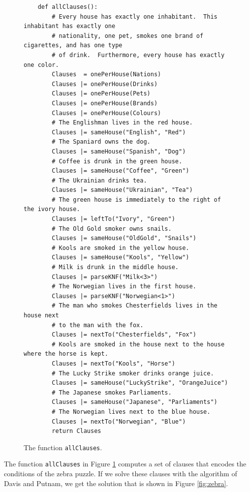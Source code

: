 \begin{figure}[!ht]
\centering
\begin{verbatim}
    def allClauses():
        # Every house has exactly one inhabitant.  This inhabitant has exactly one
        # nationality, one pet, smokes one brand of cigarettes, and has one type
        # of drink.  Furthermore, every house has exactly one color.
        Clauses  = onePerHouse(Nations)
        Clauses |= onePerHouse(Drinks)
        Clauses |= onePerHouse(Pets)
        Clauses |= onePerHouse(Brands)
        Clauses |= onePerHouse(Colours)
        # The Englishman lives in the red house.
        Clauses |= sameHouse("English", "Red")
        # The Spaniard owns the dog.
        Clauses |= sameHouse("Spanish", "Dog")
        # Coffee is drunk in the green house.
        Clauses |= sameHouse("Coffee", "Green")
        # The Ukrainian drinks tea.
        Clauses |= sameHouse("Ukrainian", "Tea")
        # The green house is immediately to the right of the ivory house.
        Clauses |= leftTo("Ivory", "Green")
        # The Old Gold smoker owns snails.
        Clauses |= sameHouse("OldGold", "Snails")
        # Kools are smoked in the yellow house.
        Clauses |= sameHouse("Kools", "Yellow")
        # Milk is drunk in the middle house.
        Clauses |= parseKNF("Milk<3>")
        # The Norwegian lives in the first house.
        Clauses |= parseKNF("Norwegian<1>")
        # The man who smokes Chesterfields lives in the house next 
        # to the man with the fox.
        Clauses |= nextTo("Chesterfields", "Fox")
        # Kools are smoked in the house next to the house where the horse is kept.
        Clauses |= nextTo("Kools", "Horse")
        # The Lucky Strike smoker drinks orange juice.
        Clauses |= sameHouse("LuckyStrike", "OrangeJuice")
        # The Japanese smokes Parliaments.
        Clauses |= sameHouse("Japanese", "Parliaments")
        # The Norwegian lives next to the blue house.
        Clauses |= nextTo("Norwegian", "Blue")
        return Clauses\end{verbatim}
\vspace*{-0.3cm}
\caption{The function \texttt{allClauses}.}
\label{fig:zebra-allClauses}
\end{figure}
The function \texttt{allClauses} in Figure \ref{fig:zebra-allClauses} computes a set of clauses that encodes the
conditions of the zebra puzzle.  If we solve these clauses with the algorithm of
Davis and Putnam, we get the solution that is shown in Figure \ref{fig:zebra}.

